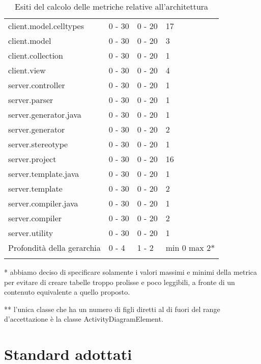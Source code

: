 \begin{longtable}{|p{5.5cm}|p{2.25cm}|p{2.25cm}|p{2.25cm}|}
		client.model.celltypes &0 - 30 &0 - 20 &17\\
		client.model &0 - 30 &0 - 20 &3\\
		client.collection &0 - 30 &0 - 20 &1\\
		client.view &0 - 30 &0 - 20 &4\\
		server.controller &0 - 30 &0 - 20 &1\\
		server.parser &0 - 30 &0 - 20 &1\\
		server.generator.java &0 - 30 &0 - 20 &1\\
		server.generator &0 - 30 &0 - 20 &2\\
		server.stereotype &0 - 30 &0 - 20 &1\\
		server.project &0 - 30 &0 - 20 &16\\
		server.template.java &0 - 30 &0 - 20 &1\\
		server.template &0 - 30 &0 - 20 &2\\
		server.compiler.java &0 - 30 &0 - 20 &1\\
		server.compiler &0 - 30 &0 - 20 &2\\
		server.utility &0 - 30 &0 - 20 &1\\
		\hline
		Profondità della gerarchia &0 - 4 &1 - 2 &min 0 max 2*\\
		\hline
		\caption{Esiti del calcolo delle metriche relative all'architettura}
		\end{longtable}
	* abbiamo deciso di specificare solamente i valori massimi e minimi della metrica per evitare di creare tabelle troppo prolisse e poco leggibili, a fronte di un contenuto equivalente a quello proposto.
	
	** l'unica classe che ha un numero di figli diretti al di fuori del range d'accettazione è la classe ActivityDiagramElement.




\section{Standard adottati}
